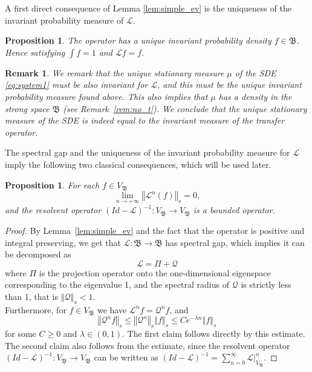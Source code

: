 \documentclass{amsart}
\newtheorem{proposition}[theorem]{Proposition}
\newtheorem{remark}[theorem]{Remark}
\newcommand\cL{{\mathcal L}}
\newcommand\fB{{\mathfrak B}}
\newcommand{\norm}[1]{\left\Vert#1\right\Vert}
\newcommand{\marginnotej}[1]{\mbox{}\marginpar{\tiny\raggedright\hspace{0pt}{{\bf sakshi}$\blacktriangleright$ \cmt #1}}}
\newcommand{\cmt}{\color{magenta}}
\begin{document}
A first direct consequence of Lemma \ref{lem:simple_ev} is the uniqueness of the invariant probability measure of $\cL$.

\begin{proposition}\label{prop:inv_den}
    The operator has a unique  invariant probability density \(f\in\fB\). Hence satisfying \(\int f=1\) and \(\cL f=f\).
\end{proposition}

\begin{remark}
   We remark that the unique stationary measure $\mu$ of the SDE \eqref{eq:system1}
     must be also invariant for $\cL$, and this must be the unique invariant probability measure found above. This also implies that $\mu$ has a density in the strong space $\fB$ (see Remark~\ref{rem:no_t}). 
   We conclude that the unique stationary measure of the SDE is indeed equal to the invariant measure of the transfer operator.
\end{remark}

The spectral gap and the uniqueness of the invariant probability measure for $\cL$ imply the following two classical consequences, which will be used later.

\begin{proposition}\label{prop:bdd_res}
 For each $f\in V_\fB$ %
\begin{equation*}
\lim_{n\rightarrow +\infty }\norm{\cL^{n}(f)}_{{s}}=0,
\end{equation*}
and the resolvent operator $(Id-\cL)^{-1}:V_{\fB}\rightarrow V_{\fB}$ is a bounded operator.
\end{proposition}

\begin{proof}
  By Lemma~\ref{lem:simple_ev} and the fact that the operator is positive and integral preserving, we get that \(\cL:\fB\to\fB\) has spectral gap, which implies it can be decomposed as
\[
\cL=\Pi+{\mathcal Q}
\]
where \(\Pi\) is the projection operator onto the one-dimensional eigenspace corresponding to the eigenvalue 1, and the spectral radius of \({\mathcal Q}\) is strictly less than 1, that is \(\norm{{\mathcal Q}}_{s}<1\). \\ 
Furthermore, for \(f\in V_\fB\) we have \(\cL^n f={\mathcal Q}^n f\), and
\[
\norm{{\mathcal Q}^n f}_{s}\leq \norm{{\mathcal Q}^n}_{s}\norm{f}_{s} \leq Ce^{-\lambda n}\norm{f}_{s}
\]
for some $C\geq0 $ and $\lambda \in (0,1)$. The first claim follows directly by this estimate. The second claim also follows from the estimate, since the resolvent operator \((Id-\cL)^{-1}:V_\fB\to V_\fB\) can be written as \((Id-\cL)^{-1}=\sum_{n=0}^\infty \cL|_{V_\fB}^n\).
\end{proof}
\end{document}
